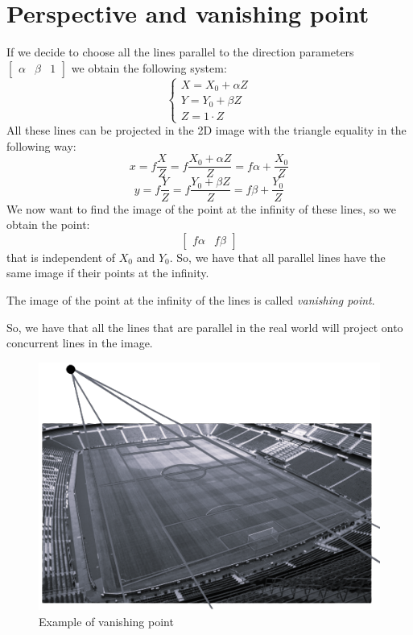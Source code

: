 \documentclass[12pt, a4paper]{report}
\begin{document}
    \section{Perspective and vanishing point}
    If we decide to choose all the lines parallel to the direction parameters $\begin{bmatrix} \alpha & \beta & 1 \end{bmatrix}$ we obtain the following system: 
    \[
        \begin{cases}
            X = X_0 + \alpha Z  \\
            Y = Y_0 + \beta Z   \\
            Z = 1 \cdot Z
        \end{cases}
    \]
    All these lines can be projected in the 2D image with the triangle equality in the following way: 
    \[x=f \dfrac{X}{Z} = f \dfrac{X_0 + \alpha Z}{Z} = f\alpha + \dfrac{X_0}{Z}\]
    \[y=f \dfrac{Y}{Z} = f \dfrac{Y_0 + \beta Z}{Z}  = f\beta  + \dfrac{Y_0}{Z}\]
    We now want to find the image of the point at the infinity of these lines, so we obtain the point: 
    \[\begin{bmatrix} f\alpha & f\beta \end{bmatrix}\]
    that is independent of $X_0$ and $Y_0$. So, we have that all parallel lines have the same image if their points at the infinity.
    \begin{definition}
        The image of the point at the infinity of the lines is called \emph{vanishing point}. 
    \end{definition}
    So, we have that all the lines that are parallel in the real world will project onto concurrent lines in the image. 
    \begin{figure}[H]
        \centering
        \includegraphics[width=0.6\linewidth]{images/vanishingpoint.png}
        \caption{Example of vanishing point}
    \end{figure}
\end{document}
